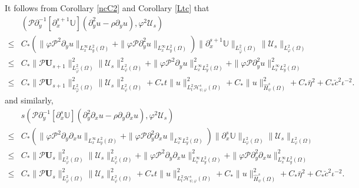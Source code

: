 \documentclass{amsart}
\numberwithin{equation}{section}
\begin{document}
It follows from Corollary \ref{ncC2} and Corollary \ref{Ltc} that
\begin{align}\label{I65}
&(\mathcal{P}\partial_{y}^{-1}[\partial_{x}^{s+1}\mathbb{U}](\partial_{y}^{2}u-\rho\partial_{y}u),\varphi^{2}\mathcal{U}_{s})\\
\leq& C_{*}(\|\varphi\mathcal{P}^{2}\partial_{y}u\|_{L_{x}^{\infty}L_{y}^{2}(\Omega)}
      +\|\varphi\mathcal{P}\partial_{y}^{2}u\|_{L_{x}^{\infty}L_{y}^{2}(\Omega)})
      \|\partial_{x}^{s+1}\mathbb{U}\|_{L_{\hat{\varphi}}^{2}(\Omega)}
      \|\mathcal{U}_{s}\|_{L_{\varphi}^{2}(\Omega)}\nonumber\\
\leq& C_{*}\|\mathcal{P}\mathbf{U}_{s+1}\|_{L_{\hat{\varphi}}^{2}(\Omega)}^{2}
      \|\mathcal{U}_{s}\|_{L_{\varphi}^{2}(\Omega)}^{2}
     +\|\varphi\mathcal{P}^{2}\partial_{y}u\|_{L_{x}^{\infty}L_{y}^{2}(\Omega)}^{2}
     +\|\varphi\mathcal{P}\partial_{y}^{2}u\|_{L_{x}^{\infty}L_{y}^{2}(\Omega)}^{2}\nonumber\\
\leq& C_{*}\|\mathcal{P}\mathbf{U}_{s+1}\|_{L_{\hat{\varphi}}^{2}(\Omega)}^{2}\|\mathcal{U}_{s}\|_{L_{\varphi}^{2}(\Omega)}^{2}
     +C_{*}t\|u\|_{L_{t}^{2}\mathcal{H}_{\psi,\varphi}^{s}(\Omega)}^{2}
     +C_{*}\|u\|_{\hat{H}_{\psi}^{s}(\Omega)}^{2}
     +C_{*}\bar{\eta}^{2}
     +C_{*}\check{c}^{2}\iota^{-2}.\nonumber
\end{align}
and similarly,
\begin{align}\label{I66}
&s(\mathcal{P}\partial_{y}^{-1}[\partial_{x}^{s}\mathbb{U}](\partial_{y}^{2}\partial_{x}u-\rho\partial_{y}\partial_{x}u),\varphi^{2}\mathcal{U}_{s})\\
\leq& C_{*}(\|\varphi\mathcal{P}^{2}\partial_{y}\partial_{x}u\|_{L_{x}^{\infty}L_{y}^{2}(\Omega)}
       +\|\varphi\mathcal{P}\partial_{y}^{2}\partial_{x}u\|_{L_{x}^{\infty}L_{y}^{2}(\Omega)})
      \|\partial_{x}^{s}\mathbb{U}\|_{L_{\varphi}^{2}(\Omega)}
      \|\mathcal{U}_{s}\|_{L_{\varphi}^{2}(\Omega)}\nonumber\\
\leq& C_{*}\|\mathcal{P}\mathbf{U}_{s}\|_{L_{\varphi}^{2}(\Omega)}^{2}
      \|\mathcal{U}_{s}\|_{L_{\varphi}^{2}(\Omega)}^{2}
     +\|\varphi\mathcal{P}^{2}\partial_{y}\partial_{x}u\|_{L_{x}^{\infty}L_{y}^{2}(\Omega)}^{2}
     +\|\varphi\mathcal{P}\partial_{y}^{2}\partial_{x}u\|_{L_{x}^{\infty}L_{y}^{2}(\Omega)}^{2}\nonumber\\
\leq& C_{*}\|\mathcal{P}\mathbf{U}_{s}\|_{L_{\varphi}^{2}(\Omega)}^{2}\|\mathcal{U}_{s}\|_{L_{\varphi}^{2}(\Omega)}^{2}
     +C_{*}t\|u\|_{L_{t}^{2}\mathcal{H}_{\psi,\varphi}^{s}(\Omega)}^{2}
     +C_{*}\|u\|_{\hat{H}_{\psi}^{s}(\Omega)}^{2}
     +C_{*}\bar{\eta}^{2}
     +C_{*}\check{c}^{2}\iota^{-2}.\nonumber
\end{align}
\end{document}
